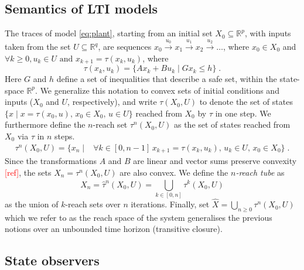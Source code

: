 \documentclass[sigconf]{llncs}
\newcommand{\mat}[1]{{#1}}
\renewcommand{\vec}[1]{{#1}}
\renewcommand{\note}[1]{\textcolor{red}{[#1]}}
\begin{document}
\subsection{Semantics of LTI models}\label{sec:model_semantics}
%
The traces of model \eqref{eq:plant}, 
starting from an initial set $X_0\subseteq \mathbb{R}^p$, 
with inputs taken from the set $U \subseteq \mathbb{R}^q$, are sequences 
$ \vec{x}_0 \xrightarrow{\vec{u}_0} \vec{x}_1 \xrightarrow{\vec{u}_1} \vec{x}_2 \xrightarrow{\vec{u}_2} \ldots $, 
%
where $ \vec{x}_0 \in X_0$ and $\forall k\geq 0, \vec{u}_k \in U \text{ and } \vec{x}_{k+1} = \tau(\vec{x}_k,\vec{u}_k) $, 
where 
%
\begin{equation}\label{equ:reachtraj}
\tau(\vec{x}_k,\vec{u}_k) = 
\big\{ \mat{A}\vec{x}_k +
\mat{B}\vec{u}_k \mid \mat{G}\vec{x}_k \leq \vec{h}\big\}\;. 
\end{equation}
%
Here $\mat{G}$ and $\vec{h}$ define a set of inequalities that describe a safe set, within the state-space $\mathbb{R}^p$.
%
We generalize this notation to convex sets of initial conditions and inputs ($X_0$ and $U$, respectively), 
and write $\tau(X_0,U)$ to denote the set of states $\{\vec{x} \mid \vec{x} = \tau(\vec{x}_0,\vec{u}),\, \vec{x}_0 \in
X_0,\, \vec{u} \in U \}$
reached from $X_0$ by $\tau$ in one step. 
%
We furthermore define the $n$-reach set $\tau^n(X_0,U)$ as the set of states reached from
$X_0$ via $\tau$ in $n$ steps.
%
\begin{align}\label{equ:reachset}
\tau^n(X_0,U) = \{\vec{x}_n \mid & 
\forall k\in [0,n-1] \, \vec{x}_{k+1}=\tau(\vec{x}_{k},\vec{u}_{k}), \,
\vec{u}_{k} \in U, \,   
\vec{x}_0 \in X_0
\} \;. 
\end{align}
%
Since the transformations $\mat{A}$ and $\mat{B}$ are linear and vector sums preserve convexity \note{ref}, 
the sets $X_n = \tau^n(X_0,U)$ are also convex.  
We define the \emph{$n$-reach tube} as 
\begin{equation}\label{equ:reachtube}
\hat{X}_n=\hat{\tau}^n(X_0,U)=\bigcup_{k\in[0,n]} \tau^k(X_0,U)
\end{equation}
as the union of $k$-reach sets over $n$ iterations. 
%
Finally, set $\hat{X} =\bigcup_{n\geq 0} \tau^n(X_0,U)$ which we refer to as
the reach space of the system generalises the previous notions over an unbounded
time horizon (transitive closure).

\subsection{State observers}\label{sec:observer}
\end{document}
